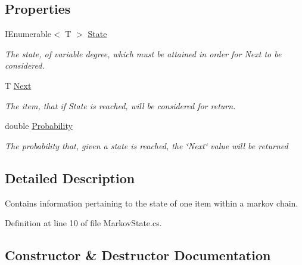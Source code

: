 \subsection*{Properties}
\begin{DoxyCompactItemize}
\item 
I\+Enumerable$<$ T $>$ \hyperlink{classHumDrum_1_1Collections_1_1Markov_1_1MarkovState_a6af42036b04d84e26d06ee5d86790094}{State}
\begin{DoxyCompactList}\small\item\em The state, of variable degree, which must be attained in order for Next to be considered. \end{DoxyCompactList}\item 
T \hyperlink{classHumDrum_1_1Collections_1_1Markov_1_1MarkovState_a825a800c1e4b27746aeb672b49e0b57b}{Next}
\begin{DoxyCompactList}\small\item\em The item, that if State is reached, will be considered for return. \end{DoxyCompactList}\item 
double \hyperlink{classHumDrum_1_1Collections_1_1Markov_1_1MarkovState_afd0a085ed23c8922067ac105af054c34}{Probability}
\begin{DoxyCompactList}\small\item\em The probability that, given a state is reached, the \char`\"{}\+Next\char`\"{} value will be returned \end{DoxyCompactList}\end{DoxyCompactItemize}


\subsection{Detailed Description}
Contains information pertaining to the state of one item within a markov chain. 



Definition at line 10 of file Markov\+State.\+cs.



\subsection{Constructor \& Destructor Documentation}
\hypertarget{classHumDrum_1_1Collections_1_1Markov_1_1MarkovState_a9a0ab2d8e1f4e31c3317af0fe81251bf}{}
